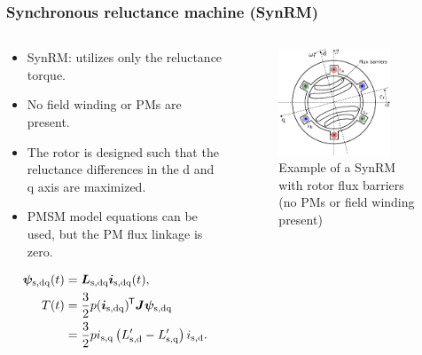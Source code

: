 \begin{frame}
	\frametitle{Synchronous reluctance machine (SynRM)}	
    \begin{columns}
		\begin{column}{0.5\textwidth}
			\begin{itemize}
				\item SynRM: utilizes only the reluctance torque.
				\item  No field winding or PMs are present.
				\item The rotor is designed such that the reluctance differences in the d and q axis are maximized.
				\item PMSM model equations can be used, but the PM flux linkage is zero.
			\end{itemize}
			\begin{equation}
				\begin{split}
					\bm{\psi}_\mathrm{s,dq}(t) &= \bm{L}_\mathrm{s,dq}\bm{i}_{\mathrm{s,dq}}(t), \\
					T(t) &= \frac{3}{2} p (\bm{i}_\mathrm{s,dq})^{\mkern-1.5mu\mathsf{T}}\bm{J}\bm{\psi}_\mathrm{s,dq}\\ &= \frac{3}{2} p i_\mathrm{s,q} \left(L'_\mathrm{s,d}-L'_\mathrm{s,q}\right)i_\mathrm{s,d}.
				\end{split}
			\end{equation}
		\end{column}
        \begin{column}{0.5\textwidth}
			\onslide<1->
            \begin{figure}
                \centering
                \includegraphics[width=0.8\textwidth]{fig/lec07/SynRM.pdf}
                \caption{Example of a SynRM with rotor flux barriers (no PMs or field winding present)}
                \label{fig:SynRM}
            \end{figure}
        \end{column}
    \end{columns}
\end{frame}


